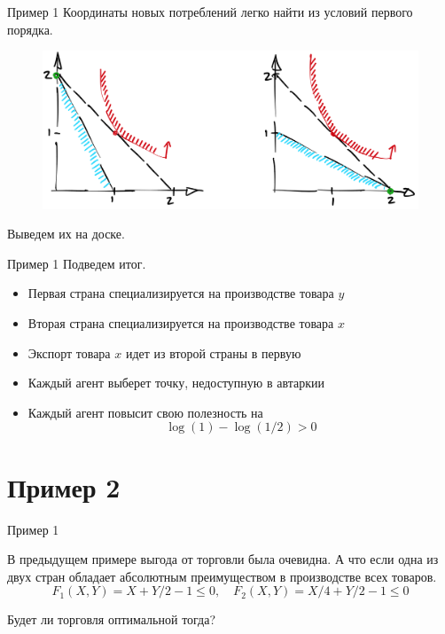 \documentclass{beamer}
\begin{document}
\begin{frame}{Пример 1}
Координаты новых потреблений легко найти из условий первого порядка.
\begin{figure}[hbt]
\centering
\includegraphics[width=1 \textwidth]{pic2.png}
\end{figure}
Выведем их на доске.
\end{frame}

\begin{frame}{Пример 1}
Подведем итог.

\begin{itemize}
  \item Первая страна специализируется на производстве товара $y$
  \item Вторая страна специализируется на производстве товара $x$
  \item Экспорт товара $x$ идет из второй страны в первую
  \item Каждый агент выберет точку, недоступную в автаркии
  \item Каждый агент повысит свою полезность на $$\log (1) - \log (1/2) > 0$$
  \end{itemize}

\end{frame}

\section{Пример 2}

\begin{frame}{Пример 1}

В предыдущем примере выгода от торговли была очевидна. А что если одна из двух стран обладает абсолютным преимуществом в производстве всех товаров.
$$ F_1(X,Y) = X + Y/2 - 1 \leqslant 0, \quad F_2(X,Y) = X/4 + Y/2 - 1 \leqslant 0$$

Будет ли торговля оптимальной тогда?

\end{frame}
\end{document}
